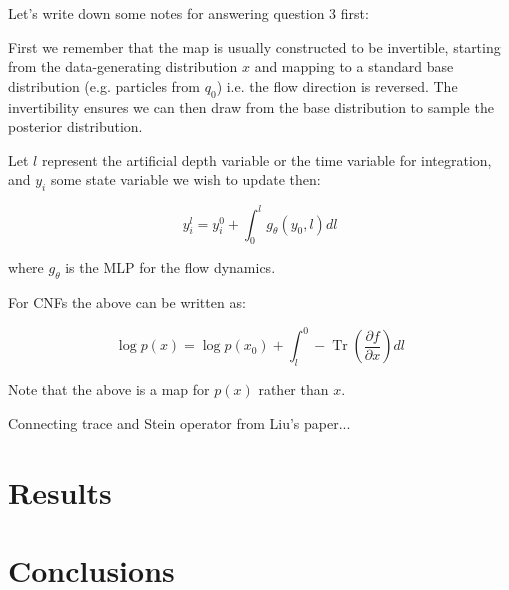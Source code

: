 \documentclass[12pt]{article}
\renewcommand{\[}{\left[}
\renewcommand{\]}{\right]}
\renewcommand{\(}{\left(}
\renewcommand{\)}{\right)}
\begin{document}





Let's write down some notes for answering question 3 first:

First we remember that the map is usually constructed to be invertible, starting from the data-generating distribution $x$ and mapping to a standard base distribution (e.g. particles from $q_0$) i.e. the flow direction is reversed. The invertibility ensures we can then draw from the base distribution to sample the posterior distribution.

Let $l$ represent the artificial depth variable or the time variable for integration, and $y_i$ some state variable we wish to update then:

$$y_i^l = y_i^0 + \int_0^{l}g_\theta(y_0, l)dl$$

where $g_\theta$ is the MLP for the flow dynamics.

For CNFs the above can be written as:

$$\log p(x) = \log p(x_0) + \int_l^0 -\operatorname{Tr}\left(\frac{\partial f}{\partial x}\right) dl$$

Note that the above is a map for $p(x)$ rather than $x$.

Connecting trace and Stein operator from Liu's paper...


\section{Results}

\section{Conclusions}



\end{document}
